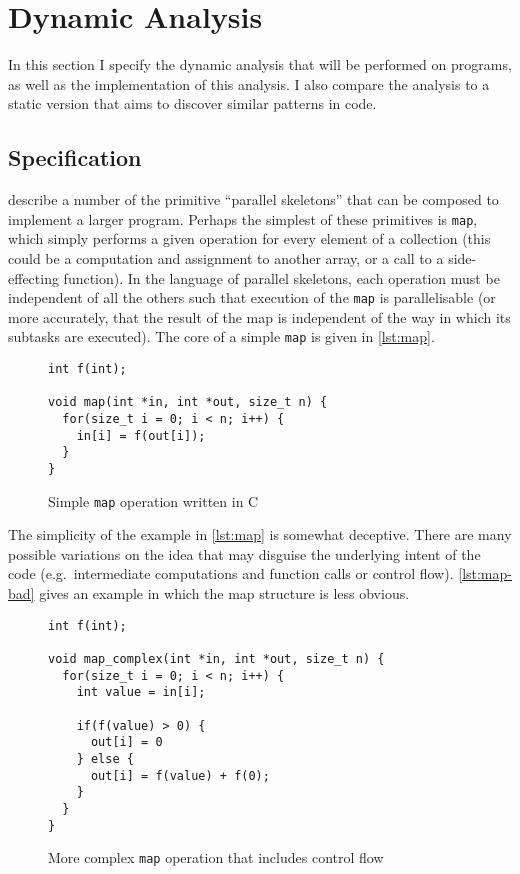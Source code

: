 \documentclass[journal]{IEEEtran}
\begin{document}
\section{Dynamic Analysis} \label{sec:dynamic}

In this section I specify the dynamic analysis that will be performed on
programs, as well as the implementation of this analysis. I also compare the
analysis to a static version that aims to discover similar patterns in code.

\subsection{Specification} \label{ssec:spec}

\textcite{darlington_parallel_1995} describe a number of the primitive
``parallel skeletons'' that can be composed to implement a larger program.
Perhaps the simplest of these primitives is \texttt{map}, which simply performs
a given operation for every element of a collection (this could be a computation
and assignment to another array, or a call to a side-effecting function). In the
language of parallel skeletons, each operation must be independent of all the
others such that execution of the \texttt{map} is parallelisable (or more
accurately, that the result of the map is independent of the way in which its
subtasks are executed). The core of a simple \texttt{map} is given in
\autoref{lst:map}.

\begin{figure}[h]
  \centering
  \begin{lstlisting}
int f(int);

void map(int *in, int *out, size_t n) {
  for(size_t i = 0; i < n; i++) {
    in[i] = f(out[i]);
  }
}
  \end{lstlisting}
  \caption{Simple \texttt{map} operation written in C}
  \label{lst:map}
\end{figure}

The simplicity of the example in \autoref{lst:map} is somewhat deceptive. There
are many possible variations on the idea that may disguise the underlying intent
of the code (e.g.\ intermediate computations and function calls or control
flow). \autoref{lst:map-bad} gives an example in which the map structure is less
obvious. 

\begin{figure}[h]
  \centering
  \begin{lstlisting}
int f(int);

void map_complex(int *in, int *out, size_t n) {
  for(size_t i = 0; i < n; i++) {
    int value = in[i];

    if(f(value) > 0) {
      out[i] = 0
    } else {
      out[i] = f(value) + f(0);
    }
  }
}
  \end{lstlisting}
  \caption{More complex \texttt{map} operation that includes control flow}
  \label{lst:map-bad}
\end{figure}
\end{document}
